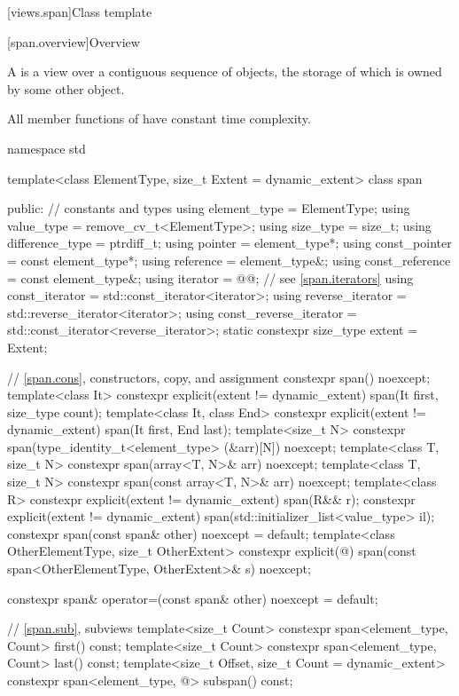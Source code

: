 [views.span]{Class template }

[span.overview]{Overview}

\pnum
{}%
A  is a view over a contiguous sequence of objects,
the storage of which is owned by some other object.

\pnum
All member functions of  have constant time complexity.

%
\begin{codeblock}
namespace std {
  template<class ElementType, size_t Extent = dynamic_extent>
  class span {
  public:
    // constants and types
    using element_type = ElementType;
    using value_type = remove_cv_t<ElementType>;
    using size_type = size_t;
    using difference_type = ptrdiff_t;
    using pointer = element_type*;
    using const_pointer = const element_type*;
    using reference = element_type&;
    using const_reference = const element_type&;
    using iterator = @@;        // see \ref{span.iterators}
    using const_iterator = std::const_iterator<iterator>;
    using reverse_iterator = std::reverse_iterator<iterator>;
    using const_reverse_iterator = std::const_iterator<reverse_iterator>;
    static constexpr size_type extent = Extent;

    // \ref{span.cons}, constructors, copy, and assignment
    constexpr span() noexcept;
    template<class It>
      constexpr explicit(extent != dynamic_extent) span(It first, size_type count);
    template<class It, class End>
      constexpr explicit(extent != dynamic_extent) span(It first, End last);
    template<size_t N>
      constexpr span(type_identity_t<element_type> (&arr)[N]) noexcept;
    template<class T, size_t N>
      constexpr span(array<T, N>& arr) noexcept;
    template<class T, size_t N>
      constexpr span(const array<T, N>& arr) noexcept;
    template<class R>
      constexpr explicit(extent != dynamic_extent) span(R&& r);
    constexpr explicit(extent != dynamic_extent) span(std::initializer_list<value_type> il);
    constexpr span(const span& other) noexcept = default;
    template<class OtherElementType, size_t OtherExtent>
      constexpr explicit(@\seebelow@) span(const span<OtherElementType, OtherExtent>& s) noexcept;

    constexpr span& operator=(const span& other) noexcept = default;

    // \ref{span.sub}, subviews
    template<size_t Count>
      constexpr span<element_type, Count> first() const;
    template<size_t Count>
      constexpr span<element_type, Count> last() const;
    template<size_t Offset, size_t Count = dynamic_extent>
      constexpr span<element_type, @\seebelow@> subspan() const;

}}
\end{codeblock}
